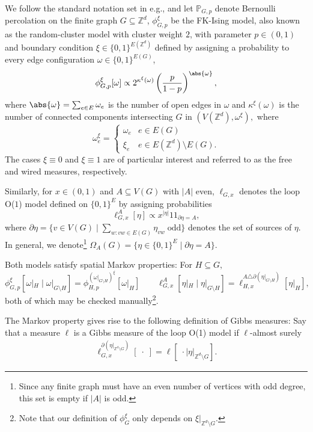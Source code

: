 \documentclass[article,11pt,reqno]{amsart}
\newcommand{\Z}{\mathbb{Z}}
\newcommand{\Prb}{\mathbb{P}}
\newcommand{\id}{1\! \!1}
\begin{document}
 We follow the standard notation set in e.g., \cite{DC17} and let $\Prb_{G,p}$ denote Bernoulli percolation on the finite graph $G\subseteq \mathbb{Z}^d$, $\phi^\xi_{G,p}$ be the FK-Ising model, also known as the random-cluster model with cluster weight $2$, with parameter $p\in (0,1)$ and boundary condition $\xi\in \{0,1\}^{E(\mathbb{Z}^d)}$ defined by assigning a probability to every edge configuration $\omega \in \{0,1\}^{E(G)}$,
$$
\phi^{\xi}_{G,p}[\omega] \propto 2^{\kappa^{\xi}(\omega)} \left( \frac{p}{1-p} \right)^{\abs{\omega}}, 
$$
where $\abs{\omega}=\sum_{e\in E}\omega_e$ is the number of open edges  in $\omega$ and $\kappa^{\xi}(\omega)$ is the number of connected components intersecting $G$ in $(V(\mathbb{Z}^d),\omega^{\xi}),$ where
$$
\omega^{\xi}_e=\begin{cases}
    \omega_e & e\in E(G) \\ \xi_e & e\in E(\mathbb{Z}^d)\setminus E(G).
\end{cases}
$$
The cases $\xi\equiv 0$ and $\xi\equiv 1$ are of particular interest and referred to as the free and wired measures, respectively.

Similarly, for $x\in (0,1)$ and $A\subseteq V(G)$ with $|A|$ even, $\ell_{G,x}$ denotes the loop O($1$) model defined on $\{0,1\}^E$ by assigning probabilities
$$
\ell^A_{G,x}[\eta]\propto x^{|\eta|}\id_{\partial \eta=A},
$$
where $\partial\eta=\{v\in V(G)\mid \sum_{w:vw\in E(G)} \eta_{vw} \;\mathrm{odd}\}$ denotes the set of sources of $\eta$. In general, we denote\footnote{Since any finite graph must have an even number of vertices with odd degree, this set is empty if $|A|$ is odd.} $\Omega_A(G)=\{\eta\in \{0,1\}^E\mid \partial \eta=A\}.$

Both models satisfy spatial Markov properties: For $H\subseteq G,$
\begin{equation*} \label{SMP}
\phi^{\xi}_{G,p}[\omega|_H \mid \omega|_{G\setminus H}]=\phi_{H,p}^{(\omega|_{G\setminus H})^{\xi}}[\omega|_H] \qquad \ell^{A}_{G,x}[\eta|_H\mid \eta|_{G\setminus H}]=\ell_{H,x}^{A\triangle\partial (\eta|_{G\setminus H})}[\eta|_H], \tag{SMP}
\end{equation*}
both of which may be checked manually\footnote{Note that our definition of $\phi^{\xi}_G$ only depends on $\xi|_{\mathbb{Z}^d\setminus G}$.}.



The Markov property gives rise to the following definition of Gibbs measures: Say that a measure $\ell$ is a Gibbs measure of the loop O(1) model if $\ell$-almost surely
\begin{align}\label{eq:definition_of_Gibbs_measure_for_loop_O(1)}
    \ell_{G,x}^{\partial (\eta\vert_{\Z^d \setminus G})}[\;\cdot\;] = \ell[\; \cdot \mid \eta\vert_{\Z^d \setminus G}].
\end{align}
\end{document}
